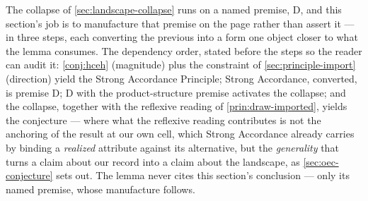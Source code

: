 \documentclass[11pt]{article}
\theoremstyle{definition}
\begin{document}
The collapse of \autoref{sec:landscape-collapse} runs on a named premise, D, and this section's job is to manufacture that premise on the page rather than assert it --- in three steps, each converting the previous into a form one object closer to what the lemma consumes. The dependency order, stated before the steps so the reader can audit it: \autoref{conj:hceh} (magnitude) plus the constraint of \autoref{sec:principle-import} (direction) yield the Strong Accordance Principle; Strong Accordance, converted, is premise D; D with the product-structure premise activates the collapse; and the collapse, together with the reflexive reading of \autoref{prin:draw-imported}, yields the conjecture --- where what the reflexive reading contributes is not the anchoring of the result at our own cell, which Strong Accordance already carries by binding a \emph{realized} attribute against its alternative, but the \emph{generality} that turns a claim about our record into a claim about the landscape, as \autoref{sec:oec-conjecture} sets out. The lemma never cites this section's conclusion --- only its named premise, whose manufacture follows.
\end{document}
